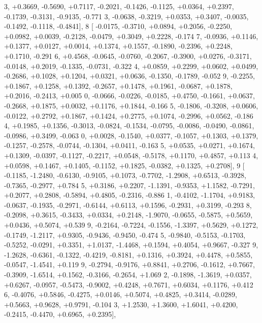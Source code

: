 \begin{DoxyCode}
      3, +0.3669, -0.5690, +0.7117, -0.2021, -0.1426, -0.1125, +0.0364, +0.2397, -0.1739, -0.3131, -0.9135, -0.771
      3, -0.0638, -0.3219, +0.0353, +0.3407, -0.0035, -0.1492, -0.1118, -0.4841],
8 [ -0.0175, -0.3710, +0.0894, +0.2056, -0.2250, +0.0982, +0.0039, -0.2128, -0.0479, +0.3049, +0.2228, -0.174
      7, -0.0936, +0.1146, +0.1377, +0.0127, +0.0014, +0.1374, +0.1557, -0.1890, -0.2396, +0.2248, +0.1710, -0.291
      6, +0.4568, -0.0645, -0.0760, -0.2067, -0.3900, +0.0276, -0.3171, -0.0148, +0.2019, -0.1335, -0.0731, -0.322
      4, +0.0859, +0.2299, +0.0602, +0.0499, -0.2686, +0.1028, +0.1204, +0.0321, +0.0636, -0.1350, -0.1789, -0.052
      9, -0.2255, +0.1867, +0.1258, +0.1392, -0.2657, +0.1478, +0.1961, -0.0687, +0.1878, +0.2016, -0.2413, +0.005
      0, -0.0666, -0.0226, -0.0185, +0.4750, -0.1661, +0.0637, -0.2668, +0.1875, +0.0032, +0.1176, +0.1844, -0.166
      5, -0.1806, -0.3208, +0.0606, -0.0122, +0.2792, +0.1867, +0.1424, +0.2775, +0.1074, -0.2996, +0.0562, -0.186
      4, +0.1985, +0.1356, -0.3013, -0.0824, -0.1534, -0.0795, -0.0086, -0.0490, -0.0861, -0.0986, +0.3499, -0.063
      0, +0.0028, -0.1540, +0.0377, -0.1057, +0.1303, +0.1379, -0.1257, -0.2578, -0.0744, -0.1304, +0.0411, -0.163
      5, +0.0535, +0.0271, +0.1674, +0.1309, -0.0397, -0.1127, -0.2217, +0.0548, -0.5178, +0.1170, +0.4857, +0.113
      4, +0.0598, +0.1467, +0.1405, -0.1152, +0.1825, -0.0382, +0.1325, +0.2708],
9 [ -0.1185, -1.2480, -0.6130, -0.9105, +0.1073, -0.7702, -1.2908, +0.6513, -0.3928, -0.7365, -0.2977, +0.784
      5, +0.3186, +0.2207, -1.1391, -0.9353, +1.1582, -0.7291, +0.2077, +0.2808, -0.5894, +0.4805, -0.2316, -0.886
      1, -0.4102, -1.1704, +0.9183, -0.0637, -0.1935, -0.2971, -0.6144, +0.6113, +0.1596, -0.2931, +0.3199, -0.293
      8, -0.2098, +0.3615, -0.3433, +0.0334, +0.2148, -1.9070, -0.0655, -0.5875, +0.5659, +0.0436, +0.5074, +0.539
      9, -0.2164, -0.7224, -0.1556, -1.3397, +0.5629, +0.1272, -0.1749, -1.2117, +0.9305, -0.9436, -0.9450, -0.474
      5, -0.9840, -0.5153, -0.1703, -0.5252, -0.0291, +0.3351, +1.0137, -1.4468, +0.1594, +0.4054, +0.9667, -0.327
      9, -1.2628, -0.6361, -0.1322, -0.4219, -0.8181, +0.1316, +0.3924, +0.4478, +0.5855, -0.0547, -1.4541, +0.119
      9, -0.2794, -0.9176, +0.8841, +0.2706, -0.1612, +0.7667, -0.3909, -1.6514, +0.1562, -0.3166, -0.2654, +1.069
      2, -0.1898, -1.3619, +0.0357, +0.6267, -0.0957, -0.5473, -0.9002, +0.4248, +0.7671, +0.6034, +0.1176, +0.412
      6, -0.4076, +0.5846, -0.4275, +0.0146, +0.5074, +0.4825, +0.3414, -0.0289, +0.5663, +0.9628, +0.9791, -0.104
      3, +1.2530, +1.3600, +1.6041, +0.4200, -0.2415, -0.4470, +0.6965, +0.2395],

\end{DoxyCode}
